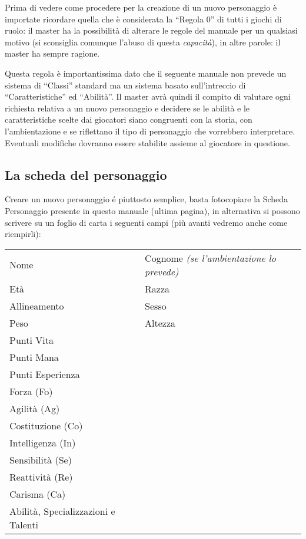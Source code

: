 \documentclass[../manuale_main.tex]{subfiles}
\begin{document}
Prima di vedere come procedere per la creazione di un nuovo personaggio è importate ricordare quella che è considerata la ``Regola 0'' di tutti i giochi di ruolo: il master ha la possibilità di alterare le regole del manuale per un qualsiasi motivo (si sconsiglia comunque l'abuso di questa \textit{capacità}), in altre parole: il master ha sempre ragione.

Questa regola è importantissima dato che il seguente manuale non prevede un sistema di ``Classi'' standard ma un sistema basato sull'intreccio di ``Caratteristiche'' ed ``Abilità''. 
Il master avrà quindi il compito di valutare ogni richiesta relativa a  un nuovo personaggio e decidere se le abilità e le caratteristiche scelte dai giocatori siano congruenti con la storia, con l'ambientazione e se riflettano il tipo di personaggio che vorrebbero interpretare. Eventuali modifiche dovranno essere stabilite assieme al giocatore in questione.
\subsection{La scheda del personaggio}
Creare un nuovo personaggio é piuttosto semplice, basta fotocopiare la Scheda Personaggio presente in questo manuale (ultima pagina), in alternativa si possono scrivere su un foglio di carta i seguenti campi (più avanti vedremo anche come riempirli):\\
\begin{center}
\renewcommand{\arraystretch}{1.2}
\begin{tabular}{ l l }
Nome & Cognome \textit{(se l'ambientazione lo prevede)} \\
Età  & Razza \\
Allineamento & Sesso \\
Peso & Altezza \\

Punti Vita &\\
Punti Mana &\\
Punti Esperienza &\\

Forza (Fo) &\\
Agilità (Ag) &\\
Costituzione (Co) &\\
Intelligenza (In) &\\
Sensibilità (Se) &\\
Reattività (Re) &\\
Carisma (Ca) &\\

Abilità, Specializzazioni e Talenti &\\
\end{tabular}
\end{center}
\end{document}
